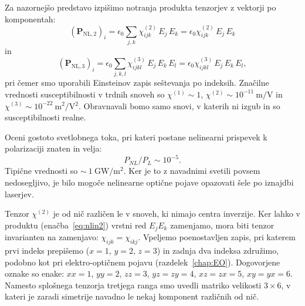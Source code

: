 Za nazornejšo predstavo izpišimo notranja produkta tenzorjev z vektorji 
po komponentah:
\begin{equation}
\left(\mathbf{P}_{\mathrm{NL,2}}\right)_i= 
\epsilon_{0}\sum_{j,k}\chi^{(2)}_{ijk} \,E_j \,E_k =
\epsilon_{0}\chi^{(2)}_{ijk} \,E_j \,E_k 
\label{eq:nlin2}
\end{equation}
in
\begin{equation}
\left(\mathbf{P}_{\mathrm{NL,3}}\right)_i= 
\epsilon_{0}\sum_{j,k,l}\chi^{(3)}_{ijkl} \,E_j \,E_k\, E_l=
\epsilon_{0}\chi^{(3)}_{ijkl} \,E_j \,E_k\, E_l,
\label{eq:nlin3}
\end{equation}
pri čemer smo uporabili Einsteinov zapis seštevanja po indeksih. Značilne vrednosti
susceptibilnosti v trdnih snoveh so $\chi^{(1)} \sim 1$, 
$\chi^{(2)} \sim 10^{-11}~\si{\metre/\volt}$ 
in $\chi^{(3)} \sim 10^{-22}~\si{\metre^2/\volt^2}$. Obravnavali bomo samo snovi, v katerih
ni izgub in so susceptibilnosti realne.

\begin{naloga}
Oceni gostoto svetlobnega toka, pri kateri postane nelinearni 
prispevek k polarizaciji znaten in velja:
 $$P_{NL}/P_L \sim 10^{-5}.$$
Tipične vrednosti so $\sim~1~\si{\giga\watt/\metre^2}$. Ker je to z navadnimi
svetili povsem nedosegljivo, je bilo mogoče nelinearne
optične pojave opazovati šele po iznajdbi laserjev.
\end{naloga}
 
Tenzor $\chi^{(2)}$ je od nič različen le v snoveh, ki nimajo centra inverzije. 
Ker lahko v produktu (enačba~\ref{eq:nlin2}) vrstni red $E_j E_k$ zamenjamo, mora biti
tenzor invarianten na zamenjavo: $\chi_{ijk} = \chi_{ikj}$.
Vpeljemo poenostavljen zapis, pri katerem prvi indeks 
prepišemo ($x=1$, $y=2$, $z=3$) in zadnja dva indeksa združimo, 
podobno kot pri elektro-optičnem pojavu (razdelek~\ref{chap:EO}).
Dogovorjene oznake so enake: $xx=1$, $yy=2$, $zz=3$, $yz=zy=4$, 
$xz=zx=5$, $xy=yx=6$. Namesto
splošnega tenzorja tretjega ranga smo uvedli matriko velikosti $3\times6$,
v kateri je zaradi simetrije navadno le nekaj komponent 
različnih od nič. 


